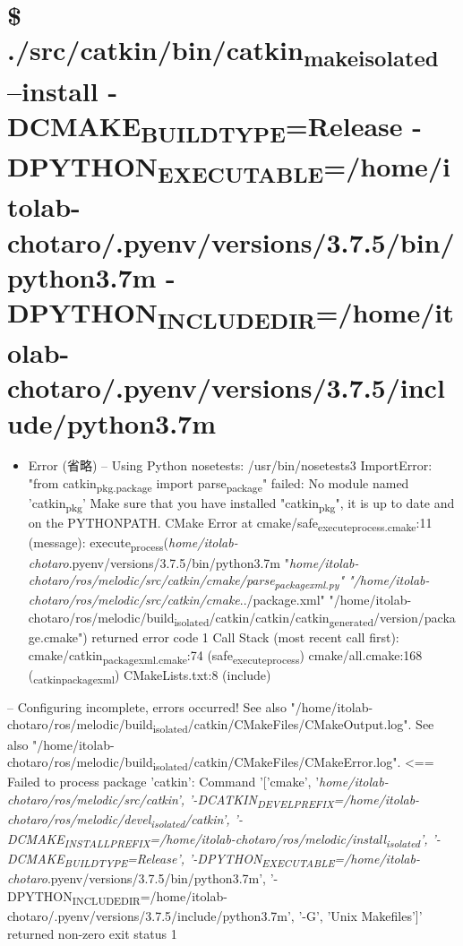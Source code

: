 \documentclass[11pt]{article}
\begin{document}
\section{\$ ./src/catkin/bin/catkin\textsubscript{make}\textsubscript{isolated} --install -DCMAKE\textsubscript{BUILD}\textsubscript{TYPE}=Release -DPYTHON\textsubscript{EXECUTABLE}=/home/itolab-chotaro/.pyenv/versions/3.7.5/bin/python3.7m -DPYTHON\textsubscript{INCLUDE}\textsubscript{DIR}=/home/itolab-chotaro/.pyenv/versions/3.7.5/include/python3.7m}
\label{sec:org492d139}
\begin{itemize}
\item Error
(省略)
-- Using Python nosetests: /usr/bin/nosetests3
ImportError: "from catkin\textsubscript{pkg.package} import parse\textsubscript{package}" failed: No module named 'catkin\textsubscript{pkg}'
Make sure that you have installed "catkin\textsubscript{pkg}", it is up to date and on the PYTHONPATH.
CMake Error at cmake/safe\textsubscript{execute}\textsubscript{process.cmake}:11 (message):
  execute\textsubscript{process}(\emph{home/itolab-chotaro}.pyenv/versions/3.7.5/bin/python3.7m
  "\emph{home/itolab-chotaro/ros/melodic/src/catkin/cmake/parse\textsubscript{package}\textsubscript{xml.py}"
  "/home/itolab-chotaro/ros/melodic/src/catkin/cmake}../package.xml"
  "/home/itolab-chotaro/ros/melodic/build\textsubscript{isolated}/catkin/catkin/catkin\textsubscript{generated}/version/package.cmake")
  returned error code 1
Call Stack (most recent call first):
  cmake/catkin\textsubscript{package}\textsubscript{xml.cmake}:74 (safe\textsubscript{execute}\textsubscript{process})
  cmake/all.cmake:168 (\textsubscript{catkin}\textsubscript{package}\textsubscript{xml})
  CMakeLists.txt:8 (include)
\end{itemize}


-- Configuring incomplete, errors occurred!
See also "/home/itolab-chotaro/ros/melodic/build\textsubscript{isolated}/catkin/CMakeFiles/CMakeOutput.log".
See also "/home/itolab-chotaro/ros/melodic/build\textsubscript{isolated}/catkin/CMakeFiles/CMakeError.log".
<== Failed to process package 'catkin': 
  Command '['cmake', '\emph{home/itolab-chotaro/ros/melodic/src/catkin', '-DCATKIN\textsubscript{DEVEL}\textsubscript{PREFIX}=/home/itolab-chotaro/ros/melodic/devel\textsubscript{isolated}/catkin', '-DCMAKE\textsubscript{INSTALL}\textsubscript{PREFIX}=/home/itolab-chotaro/ros/melodic/install\textsubscript{isolated}', '-DCMAKE\textsubscript{BUILD}\textsubscript{TYPE}=Release', '-DPYTHON\textsubscript{EXECUTABLE}=/home/itolab-chotaro}.pyenv/versions/3.7.5/bin/python3.7m', '-DPYTHON\textsubscript{INCLUDE}\textsubscript{DIR}=/home/itolab-chotaro/.pyenv/versions/3.7.5/include/python3.7m', '-G', 'Unix Makefiles']' returned non-zero exit status 1
\end{document}
